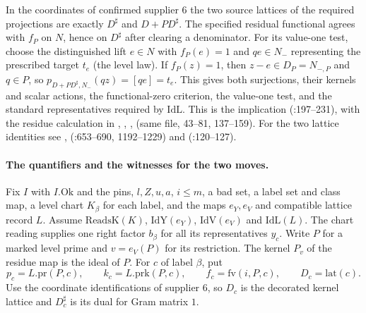 In the coordinates of confirmed supplier 6 the two source lattices of
the required projections are exactly $D^\sharp$ and $D+PD^\sharp$.
The specified residual functional agrees with $f_P$ on $N$, hence
on $D^\sharp$ after clearing a denominator. For its value-one test,
choose the distinguished lift $e\in N$ with $f_P(e)=1$ and
$qe\in N_-$ representing the prescribed target $t_e$ (the level law).
If $f_P(z)=1$, then $z-e\in D_P=N_{-,P}$ and $q\in P$, so
$p_{D+PD^\sharp,N_-}(qz)=[qe]=t_e$. This gives both surjections,
their kernels and scalar actions, the functional-zero criterion, the
value-one test, and the standard representatives required by
$\mathrm{IdL}$. This is the implication 
(:197--231), with the
residue calculation in , ,
, 
(same file, 43--81, 137--159). For the two lattice identities see
, 
(:653--690,
1192--1229) and 
(:120--127).

\paragraph{The quantifiers and the witnesses for the two moves.}\label{r13:move-fields}
Fix $I$ with $I.\mathrm{Ok}$ and the pins, $l,Z,u,a$, $i\le m$, a bad set,
a label set and class map, a level chart $K_\beta$ for each label, and the
maps $e_Y,e_V$ and compatible lattice record $L$. Assume
$\mathrm{ReadsK}(K)$, $\mathrm{IdY}(e_Y)$, $\mathrm{IdV}(e_V)$ and
$\mathrm{IdL}(L)$. The chart reading supplies one right factor $b_\beta$
for all its representatives $y_c$. Write $P$ for a marked level prime
and $v=e_V(P)$ for its restriction. The kernel $P_v$ of the residue
map is the ideal of $P$. For $c$ of label $\beta$, put
\[
  p_c=L.\mathrm{pr}(P,c),\qquad k_c=L.\mathrm{prk}(P,c),\qquad
  f_c=\mathrm{fv}(i,P,c),\qquad D_c=\mathrm{lat}(c).
\]
Use the coordinate identifications of supplier 6, so $D_c$ is the
decorated kernel lattice and $D_c^\sharp$ is its dual for Gram matrix $1$.


